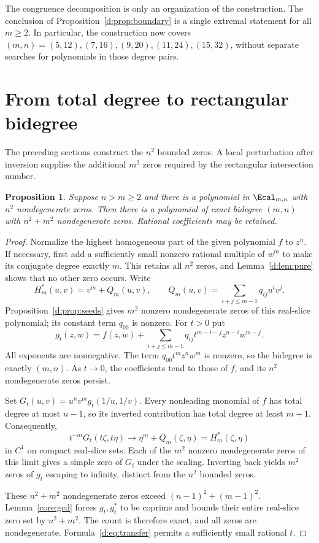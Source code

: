 \documentclass[UTF8,11pt]{ctexart}
\newtheorem{prop}[thm]{Proposition}
\theoremstyle{definition}
\numberwithin{equation}{section}
\begin{document}
The congruence decomposition is only an organization of the construction.
The conclusion of Proposition~\ref{d:prop:boundary} is a single extremal
statement for all $m\ge2$. In particular, the construction now covers
$(m,n)=(5,12),(7,16),(9,20),(11,24),(15,32)$, without separate searches
for polynomials in those degree pairs.

\section{From total degree to rectangular bidegree}\label{d:sec:transfer}

The preceding sections construct the $n^2$ bounded zeros. A local
perturbation after inversion supplies the additional $m^2$ zeros required
by the rectangular intersection number.
\begin{prop}\label{d:prop:transfer}
Suppose $n>m\ge2$ and there is a polynomial in $\Ecal_{m,n}$ with $n^2$
nondegenerate zeros. Then there is a polynomial of exact bidegree $(m,n)$
with $n^2+m^2$ nondegenerate zeros. Rational coefficients may be retained.
\end{prop}
\begin{proof}
Normalize the highest homogeneous part of the given polynomial $f$ to
$z^n$. If necessary, first add a sufficiently small nonzero rational
multiple of $w^m$ to make its conjugate degree exactly $m$. This retains
all $n^2$ zeros, and Lemma~\ref{d:lem:pure} shows that no other zero occurs.
Write
\[
 H_m^*(u,v)=v^m+Q_m(u,v),\qquad
 Q_m(u,v)=\sum_{i+j\le m-1}q_{ij}u^iv^j.
\]
Proposition~\ref{d:prop:seeds} gives $m^2$ nonzero nondegenerate zeros of
this real-slice polynomial; its constant term $q_{00}$ is nonzero.
For $t>0$ put
\begin{equation}\label{d:eq:transfer}
 g_t(z,w)=f(z,w)+
 \sum_{i+j\le m-1}q_{ij}t^{m-i-j}z^{n-i}w^{m-j}.
\end{equation}
All exponents are nonnegative. The term $q_{00}t^mz^nw^m$ is nonzero,
so the bidegree is exactly $(m,n)$. As $t\to0$, the coefficients tend to
those of $f$, and its $n^2$ nondegenerate zeros persist.

Set $G_t(u,v)=u^nv^mg_t(1/u,1/v)$. Every nonleading monomial of $f$
has total degree at most $n-1$, so its inverted contribution has total
degree at least $m+1$. Consequently,
\[
 t^{-m}G_t(t\zeta,t\eta)\longrightarrow
 \eta^m+Q_m(\zeta,\eta)=H_m^*(\zeta,\eta)
\]
in $C^1$ on compact real-slice sets. Each of the $m^2$ nonzero
nondegenerate zeros of this limit gives a simple zero of $G_t$ under
the scaling. Inverting back yields $m^2$ zeros of $g_t$ escaping to
infinity, distinct from the $n^2$ bounded zeros.

These $n^2+m^2$ nondegenerate zeros exceed
$(n-1)^2+(m-1)^2$. Lemma~\ref{core:gcd} forces $g_t,g_t^*$ to be
coprime and bounds their entire real-slice zero set by $n^2+m^2$.
The count is therefore exact, and all zeros are nondegenerate.
Formula~\eqref{d:eq:transfer} permits a sufficiently small rational $t$.
\end{proof}
\end{document}

